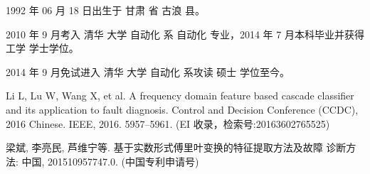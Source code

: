 \begin{resume}


  1992 年 06 月 18 日出生于 甘肃 省 古浪 县。

  2010 年 9 月考入 清华 大学 自动化 系 自动化 专业，2014 年 7 月本科毕业并获得 工学 学士学位。

  2014 年 9 月免试进入 清华 大学 自动化 系攻读 硕士 学位至今。


  \begin{publications}
    \item Li L, Lu W, Wang X, et al. A frequency domain feature based cascade
      classifier and its application to fault diagnosis. Control and Decision
      Conference (CCDC), 2016 Chinese. IEEE, 2016. 5957–5961. (EI 收录，检索号:20163602765525)
  \end{publications}



  \begin{achievements}
    \item 梁斌, 李亮民, 芦维宁等. 基于实数形式傅里叶变换的特征提取方法及故障
      诊断方法: 中国, 201510957747.0. (中国专利申请号)
  \end{achievements}

\end{resume}

